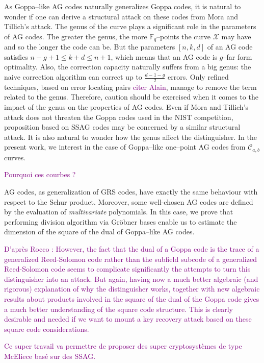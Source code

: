 \documentclass[a4paper]{article}
\theoremstyle{definition}
\theoremstyle{remark}
\newcommand{\calC}{\mathcal{C}}
\newcommand{\calX}{\mathcal{X}}
\newcommand{\F}{\mathbb{F}}
\newcommand\jade[1]{\textcolor{purple}{#1}}
\begin{document}
As Goppa--like AG codes naturally generalizes Goppa codes, it is natural to wonder if one can derive a structural attack on these codes from Mora and Tillich's attack. The genus of the curve plays a significant role in the parameters of AG codes. The greater the genus, the more $\F_q$--points the curve $\calX$ may have and so the longer the code can be. But the parameters $[n,k,d]$ of an AG code satisfies $n-g+1 \leq k+d \leq n+1$, which means that an AG code is $g$--far form optimality. Also, the correction capacity naturally suffers from a big genus: the naive correction algorithm can correct up to $\frac{d-1-g}{2}$ errors. Only refined techniques, based on error locating pairs \jade{citer Alain}, manage to remove the term related to the genus. Therefore, caution should be exercised when it comes to the impact of the genus on the properties of AG codes.
Even if Mora and Tillich's attack does not threaten the Goppa codes used in the NIST competition, proposition based on SSAG codes may be concerned by a similar structural attack. It is also natural to wonder how the genus affect the distinguisher. In the present work, we interest in the case of Goppa--like one--point AG codes from $\calC_{a,b}$ curves.

\jade{Pourquoi ces courbes ?}

AG codes, as generalization of GRS codes, have exactly the same behaviour with respect to the Schur product. Moreover, some well-chosen AG codes are defined by the evaluation of \textit{multivariate} polynomials. In this case, we prove that performing division algorithm via Gröbner bases enable us to estimate the dimension of the square of the dual of Goppa--like AG codes.

\jade{D'après Rocco \cite{MT21}: However, the fact that the dual of a Goppa code is the trace of a generalized Reed-Solomon code rather than the subfield subcode of a generalized Reed-Solomon code seems to complicate significantly the attempts to turn this distinguisher into an attack. But again, having now a much better algebraic (and rigorous) explanation of why the distinguisher works, together with new
algebraic results about products involved in the square of the dual of the Goppa code gives a much better understanding of the square code structure. This is clearly desirable and needed if we want to mount a key recovery attack based on these square code considerations.}

\jade{Ce super travail va permettre de proposer des super cryptosystèmes de type McEliece basé sur des SSAG.}
\end{document}
